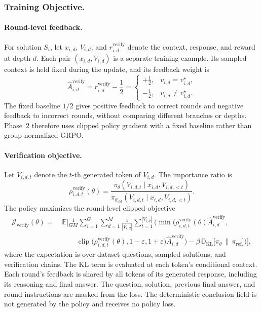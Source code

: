 \documentclass[11pt]{article}
\theoremstyle{definition}
\theoremstyle{plain}
\begin{document}
\subsubsection{Training Objective.}

\paragraph{Round-level feedback.}
For solution $S_i$, let $x_{i,d}$, $V_{i,d}$, and
$r_{i,d}^{\mathrm{verify}}$ denote the context, response, and reward
at depth $d$. Each pair $(x_{i,d},V_{i,d})$ is a separate training
example. Its sampled context is held fixed during the update, and
its feedback weight is
\begin{equation}
\hat A_{i,d}^{\mathrm{verify}}
=r_{i,d}^{\mathrm{verify}}-\frac12
=
\begin{cases}
+\frac12, & v_{i,d}=v_{i,d}^\star,\\
-\frac12, & v_{i,d}\ne v_{i,d}^\star.
\end{cases}
\end{equation}
The fixed baseline $1/2$ gives positive feedback to correct rounds
and negative feedback to incorrect rounds, without comparing
different branches or depths. Phase~2 therefore uses clipped policy
gradient with a fixed baseline rather than group-normalized GRPO.

\paragraph{Verification objective.}
Let $V_{i,d,t}$ denote the $t$-th generated token of $V_{i,d}$.
The importance ratio is
\begin{equation}
\rho_{i,d,t}^{\mathrm{verify}}(\theta)=
\frac{\pi_\theta(V_{i,d,t}\mid x_{i,d},V_{i,d,<t})}
{\pi_{\theta_{\mathrm{old}}}(V_{i,d,t}\mid x_{i,d},V_{i,d,<t})}.
\end{equation}
The policy maximizes the round-level clipped objective
\begin{equation}
\label{eq:verify-objective}
\begin{aligned}
\mathcal J_{\mathrm{verify}}(\theta)
=\;&\mathbb E
\Bigg[\frac{1}{GM}\sum_{i=1}^{G}\sum_{d=1}^{M}
\frac{1}{|V_{i,d}|}\sum_{t=1}^{|V_{i,d}|}
\Big(\min\big(
\rho_{i,d,t}^{\mathrm{verify}}(\theta)
\hat A_{i,d}^{\mathrm{verify}},\\
&\qquad
\operatorname{clip}\big(
\rho_{i,d,t}^{\mathrm{verify}}(\theta),
1-\varepsilon,1+\varepsilon\big)
\hat A_{i,d}^{\mathrm{verify}}\big)
-\beta\,\mathbb D_{\mathrm{KL}}\big[
\pi_\theta\,\|\,\pi_{\mathrm{ref}}\big]\Big)\Bigg],
\end{aligned}
\end{equation}
where the expectation is over dataset questions, sampled solutions, and verification chains. The KL term is evaluated at each token's conditional context. Each round's feedback is shared by all tokens of its generated response, including its reasoning and final answer. The question, solution, previous final answer, and round instructions are masked from the loss. The deterministic conclusion field is not generated by the policy and receives no policy loss.
\end{document}
